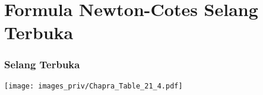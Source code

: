 \section{Formula Newton-Cotes Selang Terbuka}

\begin{frame}
\frametitle{Selang Terbuka}

{\centering
\texttt{[image: images\_priv/Chapra\_Table\_21\_4.pdf]}
\par}

\end{frame}